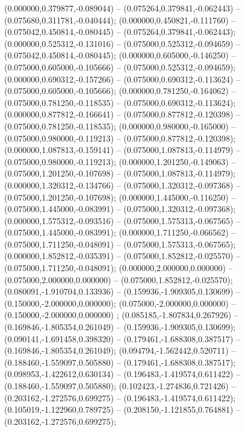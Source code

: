  (0.000000,0.379877,-0.089044) -- (0.075264,0.379841,-0.062443) -- (0.075680,0.311781,-0.040444);
 (0.000000,0.450821,-0.111760) -- (0.075042,0.450814,-0.080445) -- (0.075264,0.379841,-0.062443);
 (0.000000,0.525312,-0.131016) -- (0.075000,0.525312,-0.094659) -- (0.075042,0.450814,-0.080445);
 (0.000000,0.605000,-0.146250) -- (0.075000,0.605000,-0.105666) -- (0.075000,0.525312,-0.094659);
 (0.000000,0.690312,-0.157266) -- (0.075000,0.690312,-0.113624) -- (0.075000,0.605000,-0.105666);
 (0.000000,0.781250,-0.164062) -- (0.075000,0.781250,-0.118535) -- (0.075000,0.690312,-0.113624);
 (0.000000,0.877812,-0.166641) -- (0.075000,0.877812,-0.120398) -- (0.075000,0.781250,-0.118535);
 (0.000000,0.980000,-0.165000) -- (0.075000,0.980000,-0.119213) -- (0.075000,0.877812,-0.120398);
 (0.000000,1.087813,-0.159141) -- (0.075000,1.087813,-0.114979) -- (0.075000,0.980000,-0.119213);
 (0.000000,1.201250,-0.149063) -- (0.075000,1.201250,-0.107698) -- (0.075000,1.087813,-0.114979);
 (0.000000,1.320312,-0.134766) -- (0.075000,1.320312,-0.097368) -- (0.075000,1.201250,-0.107698);
 (0.000000,1.445000,-0.116250) -- (0.075000,1.445000,-0.083991) -- (0.075000,1.320312,-0.097368);
 (0.000000,1.575312,-0.093516) -- (0.075000,1.575313,-0.067565) -- (0.075000,1.445000,-0.083991);
 (0.000000,1.711250,-0.066562) -- (0.075000,1.711250,-0.048091) -- (0.075000,1.575313,-0.067565);
 (0.000000,1.852812,-0.035391) -- (0.075000,1.852812,-0.025570) -- (0.075000,1.711250,-0.048091);
 (0.000000,2.000000,0.000000) -- (0.075000,2.000000,0.000000) -- (0.075000,1.852812,-0.025570);
 (0.080091,-1.910704,0.133936) -- (0.159936,-1.909305,0.130699) -- (0.150000,-2.000000,0.000000);
 (0.075000,-2.000000,0.000000) -- (0.150000,-2.000000,0.000000) ;
 (0.085185,-1.807834,0.267926) -- (0.169846,-1.805354,0.261049) -- (0.159936,-1.909305,0.130699);
 (0.090141,-1.691458,0.398320) -- (0.179461,-1.688308,0.387517) -- (0.169846,-1.805354,0.261049);
 (0.094794,-1.562442,0.520711) -- (0.188460,-1.559097,0.505880) -- (0.179461,-1.688308,0.387517);
 (0.098953,-1.422612,0.630134) -- (0.196483,-1.419574,0.611422) -- (0.188460,-1.559097,0.505880);
 (0.102423,-1.274836,0.721426) -- (0.203162,-1.272576,0.699275) -- (0.196483,-1.419574,0.611422);
 (0.105019,-1.122960,0.789725) -- (0.208150,-1.121855,0.764881) -- (0.203162,-1.272576,0.699275);
